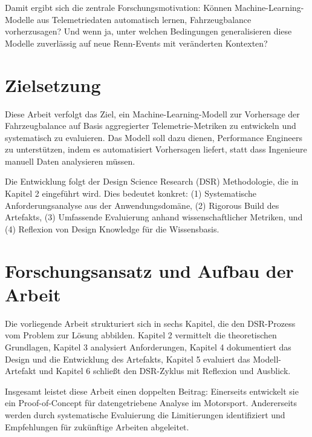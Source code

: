 Damit ergibt sich die zentrale Forschungsmotivation: Können Machine-Learning-Modelle aus Telemetriedaten automatisch lernen, Fahrzeugbalance vorherzusagen? Und wenn ja, unter welchen Bedingungen generalisieren diese Modelle zuverlässig auf neue Renn-Events mit veränderten Kontexten?

\section{Zielsetzung}

Diese Arbeit verfolgt das Ziel, ein Machine-Learning-Modell zur Vorhersage der Fahrzeugbalance auf Basis aggregierter Telemetrie-Metriken zu entwickeln und systematisch zu evaluieren. Das Modell soll dazu dienen, Performance Engineers zu unterstützen, indem es automatisiert Vorhersagen liefert, statt dass Ingenieure manuell Daten analysieren müssen.

Die Entwicklung folgt der Design Science Research (DSR) Methodologie, die in Kapitel 2 eingeführt wird. Dies bedeutet konkret: (1) Systematische Anforderungsanalyse aus der Anwendungsdomäne, (2) Rigorous Build des Artefakts, (3) Umfassende Evaluierung anhand wissenschaftlicher Metriken, und (4) Reflexion von Design Knowledge für die Wissensbasis.

\section{Forschungsansatz und Aufbau der Arbeit}

Die vorliegende Arbeit strukturiert sich in sechs Kapitel, die den DSR-Prozess vom Problem zur Lösung abbilden. Kapitel 2 vermittelt die theoretischen Grundlagen, Kapitel 3 analysiert Anforderungen, Kapitel 4 dokumentiert das Design und die Entwicklung des Artefakts, Kapitel 5 evaluiert das Modell-Artefakt und Kapitel 6 schließt den DSR-Zyklus mit Reflexion und Ausblick.

Insgesamt leistet diese Arbeit einen doppelten Beitrag: Einerseits entwickelt sie ein Proof-of-Concept für datengetriebene Analyse im Motorsport. Andererseits werden durch systematische Evaluierung die Limitierungen identifiziert und Empfehlungen für zukünftige Arbeiten abgeleitet.
